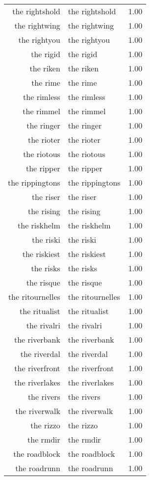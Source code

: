 \begin{table}[ht]
\begin{tabular}{rlr}
  the rightshold & the rightshold & 1.00 \\ 
  the rightwing & the rightwing & 1.00 \\ 
  the rightyou & the rightyou & 1.00 \\ 
  the rigid & the rigid & 1.00 \\ 
  the riken & the riken & 1.00 \\ 
  the rime & the rime & 1.00 \\ 
  the rimless & the rimless & 1.00 \\ 
  the rimmel & the rimmel & 1.00 \\ 
  the ringer & the ringer & 1.00 \\ 
  the rioter & the rioter & 1.00 \\ 
  the riotous & the riotous & 1.00 \\ 
  the ripper & the ripper & 1.00 \\ 
  the rippingtons & the rippingtons & 1.00 \\ 
  the riser & the riser & 1.00 \\ 
  the rising & the rising & 1.00 \\ 
  the riskhelm & the riskhelm & 1.00 \\ 
  the riski & the riski & 1.00 \\ 
  the riskiest & the riskiest & 1.00 \\ 
  the risks & the risks & 1.00 \\ 
  the risque & the risque & 1.00 \\ 
  the ritournelles & the ritournelles & 1.00 \\ 
  the ritualist & the ritualist & 1.00 \\ 
  the rivalri & the rivalri & 1.00 \\ 
  the riverbank & the riverbank & 1.00 \\ 
  the riverdal & the riverdal & 1.00 \\ 
  the riverfront & the riverfront & 1.00 \\ 
  the riverlakes & the riverlakes & 1.00 \\ 
  the rivers & the rivers & 1.00 \\ 
  the riverwalk & the riverwalk & 1.00 \\ 
  the rizzo & the rizzo & 1.00 \\ 
  the rmdir & the rmdir & 1.00 \\ 
  the roadblock & the roadblock & 1.00 \\ 
  the roadrunn & the roadrunn & 1.00 \\ 

\end{tabular}
\end{table}
